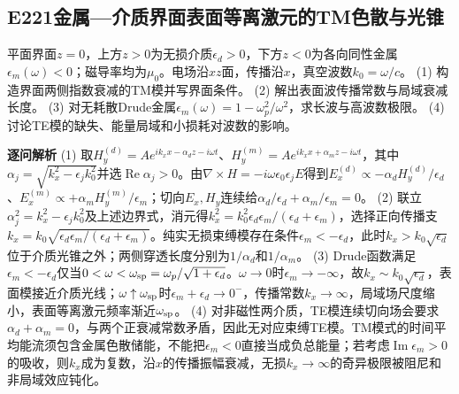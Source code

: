 \subsection*{E221\quad 金属—介质界面表面等离激元的TM色散与光锥}
平面界面$z=0$，上方$z>0$为无损介质$\epsilon_d>0$，下方$z<0$为各向同性金属$\epsilon_m(\omega)<0$；磁导率均为$\mu_0$。电场沿$xz$面，传播沿$x$，真空波数$k_0=\omega/c$。
(1) 构造界面两侧指数衰减的TM模并写界面条件。
(2) 解出表面波传播常数与局域衰减长度。
(3) 对无耗散Drude金属$\epsilon_m(\omega)=1-\omega_p^2/\omega^2$，求长波与高波数极限。
(4) 讨论TE模的缺失、能量局域和小损耗对波数的影响。
\par\textbf{逐问解析}
(1) 取$H_y^{(d)}=A e^{ik_xx-\alpha_d z-i\omega t}$、$H_y^{(m)}=A e^{ik_xx+\alpha_m z-i\omega t}$，其中$\alpha_j=\sqrt{k_x^2-\epsilon_j k_0^2}$并选$\operatorname{Re}\alpha_j>0$。由$\nabla\times H=-i\omega\epsilon_0\epsilon_jE$得到$E_x^{(d)}\propto-\alpha_d H_y^{(d)}/\epsilon_d$、$E_x^{(m)}\propto+\alpha_mH_y^{(m)}/\epsilon_m$；切向$E_x,H_y$连续给$\alpha_d/\epsilon_d+\alpha_m/\epsilon_m=0$。
(2) 联立$\alpha_j^2=k_x^2-\epsilon_j k_0^2$及上述边界式，消元得$k_x^2=k_0^2\epsilon_d\epsilon_m/(\epsilon_d+\epsilon_m)$，选择正向传播支$k_x=k_0\sqrt{\epsilon_d\epsilon_m/(\epsilon_d+\epsilon_m)}$。纯实无损束缚模存在条件$\epsilon_m<-\epsilon_d$，此时$k_x>k_0\sqrt{\epsilon_d}$位于介质光锥之外；两侧穿透长度分别为$1/\alpha_d$和$1/\alpha_m$。
(3) Drude函数满足$\epsilon_m<-\epsilon_d$仅当$0<\omega<\omega_{\rm sp}=\omega_p/\sqrt{1+\epsilon_d}$。$\omega\to0$时$\epsilon_m\to-\infty$，故$k_x\sim k_0\sqrt{\epsilon_d}$，表面模接近介质光线；$\omega\uparrow\omega_{\rm sp}$时$\epsilon_m+\epsilon_d\to0^-$，传播常数$k_x\to\infty$，局域场尺度缩小，表面等离激元频率渐近$\omega_{\rm sp}$。
(4) 对非磁性两介质，TE模连续切向场会要求$\alpha_d+\alpha_m=0$，与两个正衰减常数矛盾，因此无对应束缚TE模。TM模式的时间平均能流须包含金属色散储能，不能把$\epsilon_m<0$直接当成负总能量；若考虑$\operatorname{Im}\epsilon_m>0$的吸收，则$k_x$成为复数，沿$x$的传播振幅衰减，无损$k_x\to\infty$的奇异极限被阻尼和非局域效应钝化。
\par\medskip
